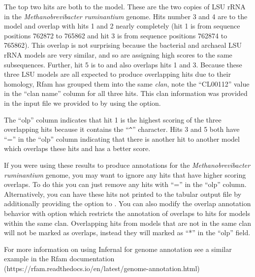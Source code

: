 The top two hits are both to the 
model. These are the two copies of LSU rRNA in the
\emph{Methanobrevibacter ruminantium} genome. Hits number 3 and 4
are to the  model and overlap with hits 1
and 2 nearly completely (hit 1 is from sequence positions 762872 to 765862 and
hit 3 is from sequence positions 762874 to 765862). This overlap is not
surprising because the bacterial and archaeal LSU rRNA models are very
similar, and so are assigning high scores to the same
subsequences. Further, hit 5 is to  and also
overlaps hits 1 and 3. Because these three LSU models are all expected
to produce overlapping hits due to their homology, Rfam has grouped
them into the same \emph{clan}, note the ``CL00112'' value in the ``clan
name'' column for all three hits. This clan information was provided
in the  input file we provided to 
by using the  option. 

The ``olp'' column indicates that hit 1 is the highest scoring of the
three overlapping hits because it contains the ``\verb+^+''
character. Hits 3 and 5 both have ``='' in the ``olp'' column
indicating that there is another hit to another model which overlaps
these hits and has a better score.

If you were using these results to produce annotations for the 
\emph{Methanobrevibacter ruminantium} genome, you may want to ignore 
any hits that have higher scoring overlaps. To do this you can just
remove any hits with ``='' in the ``olp'' column. Alternatively, you
can have these hits not printed to the tabular output file by
additionally providing the  option to .
You can also modify the overlap annotation behavior with
 option which restricts the annotation of overlaps to
hits for models within the same clan. Overlapping hits from models
that are not in the same clan will not be marked as
overlaps, instead they will marked as ``*'' in the ``olp'' field.

For more information on using Infernal for genome annotation see a
similar example in the Rfam documentation
(https://rfam.readthedocs.io/en/latest/genome-annotation.html)

